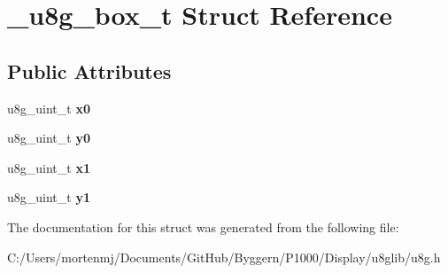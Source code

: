 \hypertarget{struct__u8g__box__t}{\section{\-\_\-u8g\-\_\-box\-\_\-t Struct Reference}
\label{struct__u8g__box__t}
}
\subsection*{Public Attributes}
\begin{DoxyCompactItemize}
\item 
\hypertarget{struct__u8g__box__t_a373cf0e353ba84f83760ec128b0d59f6}{u8g\-\_\-uint\-\_\-t {\bfseries x0}}\label{struct__u8g__box__t_a373cf0e353ba84f83760ec128b0d59f6}

\item 
\hypertarget{struct__u8g__box__t_ac641522ecb406043be167af1fe550c32}{u8g\-\_\-uint\-\_\-t {\bfseries y0}}\label{struct__u8g__box__t_ac641522ecb406043be167af1fe550c32}

\item 
\hypertarget{struct__u8g__box__t_a2c95d687584caa81ec7bb0eb967d58a5}{u8g\-\_\-uint\-\_\-t {\bfseries x1}}\label{struct__u8g__box__t_a2c95d687584caa81ec7bb0eb967d58a5}

\item 
\hypertarget{struct__u8g__box__t_ab8b30fc15cef5ccf432c5f10fa443b9b}{u8g\-\_\-uint\-\_\-t {\bfseries y1}}\label{struct__u8g__box__t_ab8b30fc15cef5ccf432c5f10fa443b9b}

\end{DoxyCompactItemize}


The documentation for this struct was generated from the following file\-:\begin{DoxyCompactItemize}
\item 
C\-:/\-Users/mortenmj/\-Documents/\-Git\-Hub/\-Byggern/\-P1000/\-Display/u8glib/u8g.\-h\end{DoxyCompactItemize}
